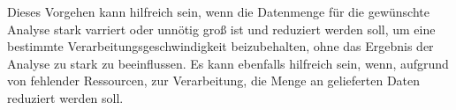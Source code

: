 Dieses Vorgehen kann hilfreich sein, 
wenn die Datenmenge für die gewünschte Analyse stark varriert oder unnötig groß ist und reduziert werden soll, 
um eine bestimmte Verarbeitungsgeschwindigkeit beizubehalten, 
ohne das Ergebnis der Analyse zu stark zu beeinflussen.
Es kann ebenfalls hilfreich sein, 
wenn, aufgrund von fehlender Ressourcen, zur Verarbeitung, 
die Menge an gelieferten Daten reduziert werden soll.